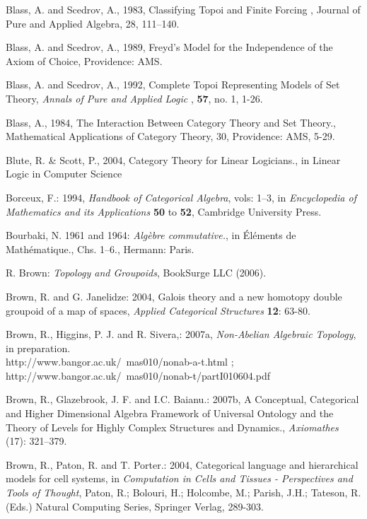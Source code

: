 \documentclass[12pt]{article}
\begin{document}
\begin{thebibliography}{399}
Blass, A. and Scedrov, A., 1983, Classifying Topoi and Finite Forcing , Journal of Pure and Applied Algebra, 28, 111--140. 

Blass, A. and Scedrov, A., 1989, Freyd's Model for the Independence of the Axiom of Choice, Providence: AMS.  

Blass, A. and Scedrov, A., 1992, Complete Topoi Representing Models of Set Theory, 
{\em Annals of Pure and Applied Logic} , {\bf 57}, no. 1, 1-26.  

Blass, A., 1984, The Interaction Between Category Theory and Set Theory., Mathematical Applications of Category Theory, 30, Providence: AMS, 5-29. 

Blute, R. \& Scott, P., 2004, Category Theory for Linear Logicians., in Linear Logic in Computer Science

Borceux, F.: 1994, \emph{Handbook of Categorical Algebra}, vols: 1--3, 
in {\em Encyclopedia of Mathematics and its Applications} \textbf{50} to \textbf{52}, Cambridge University Press.

Bourbaki, N. 1961 and 1964: \emph{Alg\`{e}bre commutative.},
in \'{E}l\'{e}ments de Math\'{e}matique., Chs. 1--6., Hermann: Paris.

R. Brown: \emph{Topology and Groupoids}, BookSurge LLC (2006).

Brown, R. and G. Janelidze: 2004, Galois theory and a new homotopy
double groupoid of a map of spaces, \emph{Applied Categorical
Structures} \textbf{12}: 63-80.

Brown, R., Higgins, P. J. and R. Sivera,: 2007a, \emph{Non-Abelian
Algebraic Topology}, in preparation.\\
http://www.bangor.ac.uk/~mas010/nonab-a-t.html ; \\
http://www.bangor.ac.uk/~mas010/nonab-t/partI010604.pdf

Brown, R., Glazebrook, J. F. and I.C. Baianu.: 2007b, A Conceptual, Categorical and Higher Dimensional Algebra Framework of Universal Ontology and the Theory of Levels for Highly Complex Structures and Dynamics., \emph{Axiomathes} (17): 321--379.

Brown, R., Paton, R. and T. Porter.: 2004, Categorical language and
hierarchical models for cell systems, in \emph{Computation in
Cells and Tissues - Perspectives and Tools of Thought}, Paton, R.;
Bolouri, H.; Holcombe, M.; Parish, J.H.; Tateson, R. (Eds.)
Natural Computing Series, Springer Verlag, 289-303.


\end{thebibliography}
\end{document}

